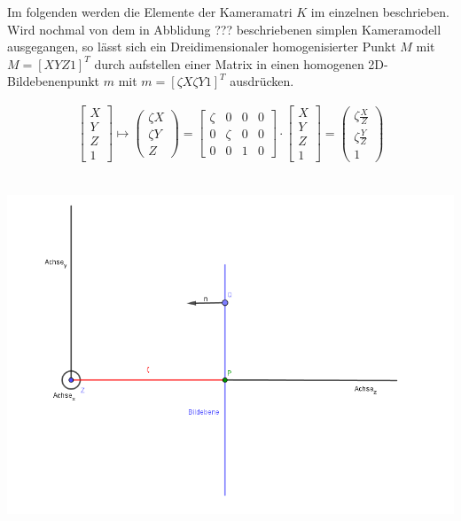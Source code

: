 Im folgenden werden die Elemente der Kameramatri $K$ im einzelnen beschrieben. Wird nochmal von dem in Abblidung ??? beschriebenen simplen Kameramodell ausgegangen, so lässt sich ein Dreidimensionaler homogenisierter Punkt $M$ mit $M = [X Y Z 1]^T$ durch aufstellen einer Matrix in einen homogenen 2D-Bildebenenpunkt $m$ mit $m = [\zeta X \zeta Y 1]^T$ ausdrücken.

\begin{gather}
	\begin{bmatrix}
	X\\Y\\Z\\1
	\end{bmatrix} \mapsto
	\begin{pmatrix}
	\zeta X\\ \zeta Y\\ Z
	\end{pmatrix}
	=
	\begin{bmatrix}
	\zeta&0&0&0\\
	0&\zeta&0&0\\
	0&0&1&0
	\end{bmatrix}
	\cdot
	\begin{bmatrix}
	X\\Y\\Z\\1
	\end{bmatrix}
	=
	\begin{pmatrix}
	\zeta \frac{X}{Z}\\ \zeta \frac{Y}{Z}\\1
	\end{pmatrix}
\end{gather}\\



\begin{minipage}{\linewidth}
	\centering
	\includegraphics[width=1.\linewidth]{images/ZetaHerleitung.png}
	\label{fig:zetaErklaerung}
\end{minipage}\\

